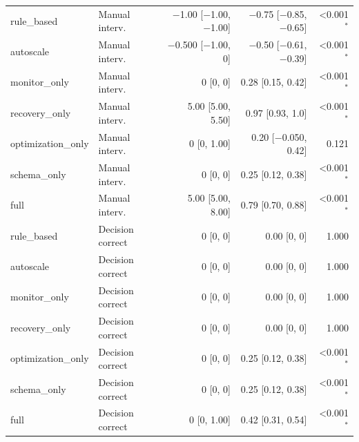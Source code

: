 \begin{tabular}{llrrr}
rule\_based & Manual interv. & \ensuremath{-}1.00 [\ensuremath{-}1.00, \ensuremath{-}1.00] & \ensuremath{-}0.75 [\ensuremath{-}0.85, \ensuremath{-}0.65] & <0.001$^{*}$ \\
autoscale & Manual interv. & \ensuremath{-}0.500 [\ensuremath{-}1.00, 0] & \ensuremath{-}0.50 [\ensuremath{-}0.61, \ensuremath{-}0.39] & <0.001$^{*}$ \\
monitor\_only & Manual interv. & 0 [0, 0] & 0.28 [0.15, 0.42] & <0.001$^{*}$ \\
recovery\_only & Manual interv. & 5.00 [5.00, 5.50] & 0.97 [0.93, 1.0] & <0.001$^{*}$ \\
optimization\_only & Manual interv. & 0 [0, 1.00] & 0.20 [\ensuremath{-}0.050, 0.42] & 0.121 \\
schema\_only & Manual interv. & 0 [0, 0] & 0.25 [0.12, 0.38] & <0.001$^{*}$ \\
full & Manual interv. & 5.00 [5.00, 8.00] & 0.79 [0.70, 0.88] & <0.001$^{*}$ \\
rule\_based & Decision correct & 0 [0, 0] & 0.00 [0, 0] & 1.000 \\
autoscale & Decision correct & 0 [0, 0] & 0.00 [0, 0] & 1.000 \\
monitor\_only & Decision correct & 0 [0, 0] & 0.00 [0, 0] & 1.000 \\
recovery\_only & Decision correct & 0 [0, 0] & 0.00 [0, 0] & 1.000 \\
optimization\_only & Decision correct & 0 [0, 0] & 0.25 [0.12, 0.38] & <0.001$^{*}$ \\
schema\_only & Decision correct & 0 [0, 0] & 0.25 [0.12, 0.38] & <0.001$^{*}$ \\
full & Decision correct & 0 [0, 1.00] & 0.42 [0.31, 0.54] & <0.001$^{*}$ \\
\bottomrule
\end{tabular}
